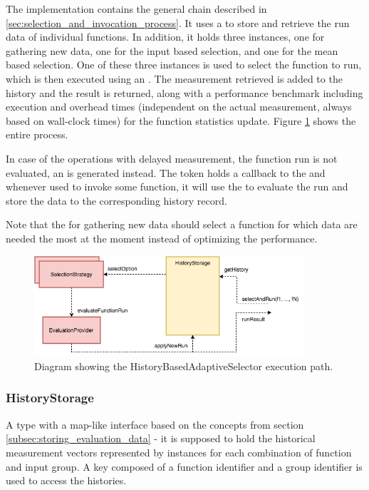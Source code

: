 The implementation  contains the general chain described in \ref{sec:selection_and_invocation_process}. It uses a  to store and retrieve the run data of individual functions. In addition, it holds three  instances, one for gathering new data, one for the input based selection, and one for the mean based selection. One of these three instances is used to select the function to run, which is then executed using an . The measurement retrieved is added to the history and the result is returned, along with a performance benchmark including execution and overhead times (independent on the actual measurement, always based on wall-clock times) for the function statistics update. Figure \ref{fig:history_based_selector} shows the entire process.

In case of the operations with delayed measurement, the function run is not evaluated, an  is generated instead. The token holds a callback to the  and whenever used to invoke some function, it will use the  to evaluate the run and store the data to the corresponding history record.

Note that the  for gathering new data should select a function for which data are needed the most at the moment instead of optimizing the performance.

\begin{figure}[h!]
	\captionsetup{justification=centering,margin=0.5cm}
	\centerline{\mbox{\includegraphics[width=100mm]{./img/history_based_selector.png}}}
	\caption{Diagram showing the HistoryBasedAdaptiveSelector execution path.}
	\label{fig:history_based_selector}
\end{figure}

\subsubsection{HistoryStorage}

A type with a map-like interface based on the concepts from section \ref{subsec:storing_evaluation_data} - it is supposed to hold the historical measurement vectors represented by  instances for each combination of function and input group. A key composed of a function identifier and a group identifier is used to access the histories.

